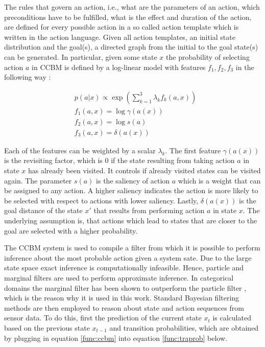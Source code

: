 \documentclass[11pt,titlepage,oneside,openany]{book}
\begin{document}
The rules that govern an action, i.e., what are the parameters of an action, which preconditions have to be fulfilled, what is the effect and duration of the action, are defined for every possible action in a so called action template which is written in the action language. Given all action templates, an initial state distribution and the goal(s), a directed graph from the initial to the goal state(s) can be generated. In particular, given some state $x$ the probability of selecting action $a$ in CCBM is defined by a log-linear model with features $f_1, f_2, f_3$ in the following way \cite{rueda_combining_2019}:

\begin{align}
	&p(a|x) \propto 	\exp(\sum_{k=1}^{3} \lambda_k f_k(a,x)) \label{func:ccbm} \\
	&f_1(a,x) = 		\log \gamma(a(x)) \\
	&f_2(a,x) = 		\log s(a) \\
	&f_3(a,x) = 		\delta(a(x))
\end{align}

\noindent Each of the features can be weighted by a scalar $\lambda_k$. The first feature $\gamma(a(x))$ is the revisiting factor, which is 0 if the state resulting from taking action $a$ in state $x$ has already been visited. It controls if already visited states can be visited again. The parameter $s(a)$ is the saliency of action $a$ which is a weight that can be assigned to any action. A higher saliency indicates the action is more likely to be selected with respect to actions with lower saliency. Lastly, $\delta(a(x))$ is the goal distance of the state $x'$ that results from performing action $a$ in state $x$. The underlying assumption is, that actions which lead to states that are closer to the goal are selected with a higher probability.

The CCBM system is used to compile a filter from which it is possible to perform inference about the most probable action given a system sate. Due to the large state space exact inference is computationally infeasible. Hence, particle and marginal filters are used to perform approximate inference. In categorical domains the marginal filter has been shown to outperform the particle filter \cite{kruger_computational_2014}, which is the reason why it is used in this work. Standard Bayesian filtering methods are then employed to reason about state and action sequences from sensor data. To do this, first the prediction of the current state $x_t$ is calculated based on the previous state $x_{t-1}$ and transition probabilities, which are obtained by plugging in equation \ref{func:ccbm} into equation \ref{func:traprob} below.
\end{document}
